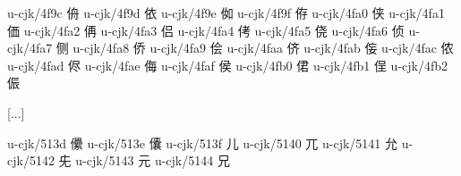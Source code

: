 \begin{multicols}{2}
[...] 
 
u-cjk/4f9c	{\cjk{}侜}	 
u-cjk/4f9d	{\cjk{}依}	 
u-cjk/4f9e	{\cjk{}侞}	 
u-cjk/4f9f	{\cjk{}侟}	 
u-cjk/4fa0	{\cjk{}侠}	 
u-cjk/4fa1	{\cjk{}価}	 
u-cjk/4fa2	{\cjk{}侢}	 
u-cjk/4fa3	{\cjk{}侣}	 
u-cjk/4fa4	{\cjk{}侤}	 
u-cjk/4fa5	{\cjk{}侥}	 
u-cjk/4fa6	{\cjk{}侦}	 
u-cjk/4fa7	{\cjk{}侧}	 
u-cjk/4fa8	{\cjk{}侨}	 
u-cjk/4fa9	{\cjk{}侩}	 
u-cjk/4faa	{\cjk{}侪}	 
u-cjk/4fab	{\cjk{}侫}	 
u-cjk/4fac	{\cjk{}侬}	 
u-cjk/4fad	{\cjk{}侭}	 
u-cjk/4fae	{\cjk{}侮}	 
u-cjk/4faf	{\cjk{}侯}	 
u-cjk/4fb0	{\cjk{}侰}	 
u-cjk/4fb1	{\cjk{}侱}	 
u-cjk/4fb2	{\cjk{}侲}	 
 
[...] 
 
u-cjk/513d	{\cjk{}儽}	 
u-cjk/513e	{\cjk{}儾}	 
u-cjk/513f	{\cjk{}儿}	 
u-cjk/5140	{\cjk{}兀}	 
u-cjk/5141	{\cjk{}允}	 
u-cjk/5142	{\cjk{}兂	} 
u-cjk/5143	{\cjk{}元}	 
u-cjk/5144	{\cjk{}兄}	 
 

\end{multicols}
